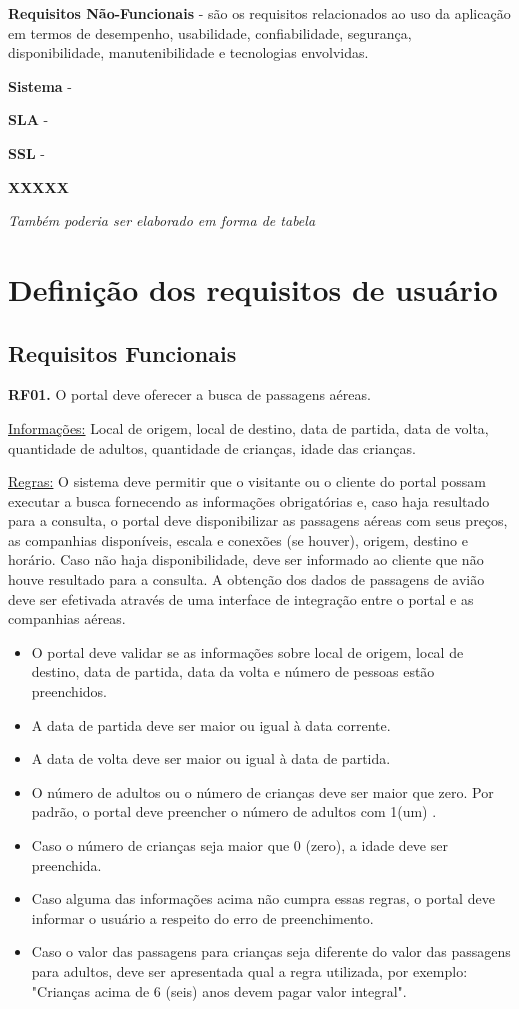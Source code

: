 \documentclass[12pt,twoside,a4paper]{article}
\begin{document}
\textbf{Requisitos Não-Funcionais} - são os requisitos relacionados ao uso da aplicação em termos de desempenho, usabilidade, confiabilidade, segurança, disponibilidade, manutenibilidade e tecnologias envolvidas.
 
\textbf{Sistema} -  

\textbf{SLA} - 
 
\textbf{SSL} - 
 
\textbf{XXXXX}

\textit{Também poderia ser elaborado em forma de tabela}

\section{Definição dos requisitos de usuário}
\subsection{Requisitos Funcionais}

\textbf{RF01.} O portal deve oferecer a busca de passagens aéreas.

\underline{Informações:} Local de origem, local de destino, data de partida, data de volta, quantidade  de adultos, quantidade de crianças, idade das crianças.

\underline{Regras:} O sistema deve permitir que o visitante ou o cliente do portal possam executar a busca fornecendo as informações obrigatórias e, caso haja resultado para a consulta, o portal deve disponibilizar as passagens aéreas com seus preços, as companhias disponíveis, escala e conexões (se houver), origem, destino e horário. Caso não haja disponibilidade, deve ser informado ao cliente que não houve resultado para a consulta. A obtenção dos dados de passagens de avião deve ser efetivada através de uma interface de integração entre o portal e as companhias aéreas.

\begin{itemize}

\item O portal deve validar se as informações sobre local de origem, local de destino, data de partida, data da volta e número de pessoas estão preenchidos.
\item A data de partida deve ser maior ou igual à data corrente.
\item A data de volta deve ser maior ou igual à data de partida.
\newpage
\item O número de adultos ou o número de crianças deve ser maior que zero. Por padrão, o portal deve preencher o número de adultos com 1(um) .
\item Caso o número de crianças seja maior que 0 (zero), a idade deve ser preenchida.
\item Caso alguma das informações acima não cumpra essas regras, o portal deve informar o usuário a respeito do erro de preenchimento. 
\item Caso o valor das passagens para crianças seja diferente do valor das passagens para adultos, deve ser apresentada qual a regra utilizada, por exemplo: "Crianças acima de 6 (seis) anos devem pagar valor integral".

\end{itemize}
\end{document}
